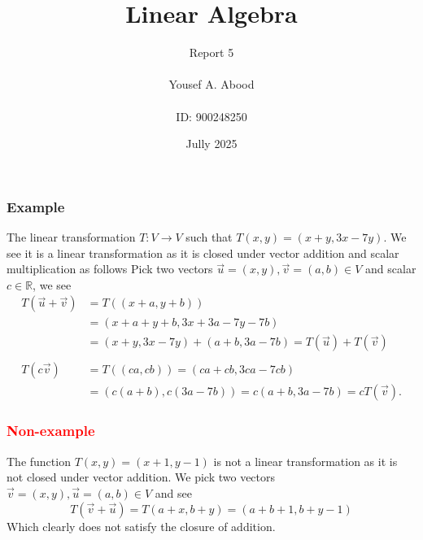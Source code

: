 \documentclass[12pt]{article}
\title{Linear Algebra}
\author{Report 5\\ \\ Yousef A. Abood\\ \\ ID: 900248250}
\date{Jully 2025}
\begin{document}
\maketitle
\noindent\makebox[\linewidth]{\rule{15cm}{0.4pt}}

\subsubsection*{Example}
The linear transformation $T:V \to V$ such that $T(x,y)=(x+y,3x-7y).$ We see it is a linear transformation as it is closed under vector addition and scalar multiplication as follows
Pick two vectors $\vec{u}=(x,y), \vec{v}=(a,b) \in V$ and scalar $c \in \mathbb{R}$, we see
\begin{align*}
    T(\vec{u}+\vec{v})&=T((x+a,y+b))\\
    &=(x+a+y+b, 3x+3a-7y-7b)\\
     &=(x+y,3x-7y)+(a+b,3a-7b)=T(\vec{u})+T(\vec{v})\\
\\
    T(c\vec{v})&=T((ca,cb))=(ca+cb, 3ca-7cb) \\ 
    &= (c(a+b), c(3a-7b))=c(a+b, 3a-7b)=cT(\vec{v}).
\end{align*}

\subsubsection*{\textcolor{red}{Non-example}}
The function $T(x,y)=(x+1,y-1)$ is not a linear transformation as it is not closed under vector addition. We pick two vectors $\vec{v}=(x,y), \vec{u}=(a,b) \in V$ and see
\[T(\vec{v}+ \vec{u})= T(a+x,b+y)=(a+b+1, b+y-1)\]
Which clearly does not satisfy the closure of addition.
\end{document}
